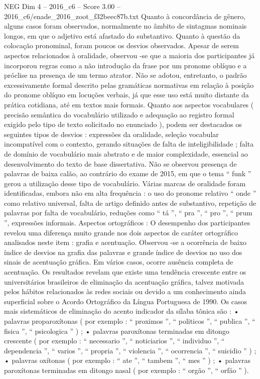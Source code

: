 \begin{textsample}{NEG Dim 4 – 2016\_c6 – Score 3.00 – 2016\_c6/enade\_2016\_zoot\_f32beec87b.txt}
Quanto à concordância de gênero, alguns casos foram observados, normalmente no âmbito de sintagmas nominais longos, em que o adjetivo está afastado do substantivo.
Quanto à questão da colocação pronominal, foram poucos os desvios observados.
Apesar de serem aspectos relacionados à oralidade, observou -se que a maioria dos participantes já incorporou regras como a não introdução da frase por um pronome oblíquo e a próclise na presença de um termo atrator.
Não se adotou, entretanto, o padrão excessivamente formal descrito pelas gramáticas normativas em relação à posição do pronome oblíquo em locuções verbais, já que esse uso está muito distante da prática cotidiana, até em textos mais formais.
Quanto aos aspectos vocabulares ( precisão semântica do vocabulário utilizado e adequação ao registro formal exigido pelo tipo de texto solicitado no enunciado ), podem ser destacados os seguintes tipos de desvios : expressões da oralidade, seleção vocabular incompatível com o contexto, gerando situações de falta de inteligibilidade ; falta de domínio de vocabulário mais abstrato e de maior complexidade, essencial ao desenvolvimento do texto de base dissertativa.
Não se observou presença de palavras de baixa calão, ao contrário do exame de 2015, em que o tema “ funk ” gerou a utilização desse tipo de vocabulário.
Várias marcas de oralidade foram identificadas, embora não em alta frequência : o uso do pronome relativo “ onde ” como relativo universal, falta de artigo definido antes de substantivo, repetição de palavras por falta de vocabulário, reduções como “ tá ”, “ pra ”, “ pro ”, “ prum ”, expressões informais.
Aspectos ortográficos : O desempenho dos participantes revelou uma diferença muito grande nos dois aspectos de caráter ortográfico analisados neste item : grafia e acentuação.
Observou -se a ocorrência de baixo índice de desvios na grafia das palavras e grande índice de desvios no uso dos sinais de acentuação gráfica.
Em vários casos, ocorre ausência completa de acentuação.
Os resultados revelam que existe uma tendência crescente entre os universitários brasileiros de eliminação da acentuação gráfica, talvez motivada pelos hábitos relacionados às redes sociais ou devido a um conhecimento ainda superficial sobre o Acordo Ortográfico da Língua Portuguesa de 1990.
Os casos mais sistemáticos de eliminação do acento indicador da sílaba tônica são : • palavras proparoxítonas ( por exemplo : “ proximos ”, “ politicos ”, “ publica ”, “ fisica ”, “ psicologica ” ) ; • palavras paroxítonas terminadas em ditongo crescente ( por exemplo : “ necessario ”, “ noticiarios ”, “ individuo ”, “ dependencia ”, “ varios ”, “ propria ”, “ violencia ”, “ ocorrencia ”, “ suicidio ” ) ; • palavras oxítonas ( por exemplo : “ ate ”, “ tambem ”, “ mes ” ) ; • palavras paroxítonas terminadas em ditongo nasal ( por exemplo : “ orgão ”, “ orfão ” ).

\end{textsample}
